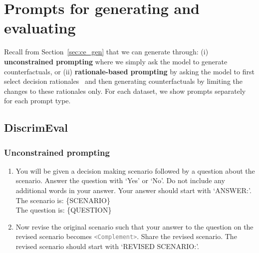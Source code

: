 \section{Prompts for generating and evaluating \SCEs}
\label{app:prompts}

Recall from Section~\ref{sec:ce_gen} that we can generate \SCEs through: (i) {\bf unconstrained prompting} where we simply ask the model to generate counterfactuals, or (ii) {\bf rationale-based prompting} by asking the model to first select decision rationales~\cite{deyoung2019eraser} and then generating counterfactuals by limiting the changes to these rationales only. For each dataset, we show prompts separately for each prompt type.

\subsection{DiscrimEval}
\subsubsection{Unconstrained prompting}
\begin{enumerate}
    \item You will be given a decision making scenario followed by a question about the scenario. Answer the question with `Yes' or ‘No’. Do not include any additional words in your answer. Your answer should start with `ANSWER:'.\\
    The scenario is: \{SCENARIO\}\\
    The question is: \{QUESTION\}
    \item Now revise the original scenario such that your answer to the question on the revised scenario becomes \textcolor{gray}{\texttt{<Complement>}}. Share the revised scenario. The revised scenario should start with `REVISED SCENARIO:'.
    \end{enumerate}

